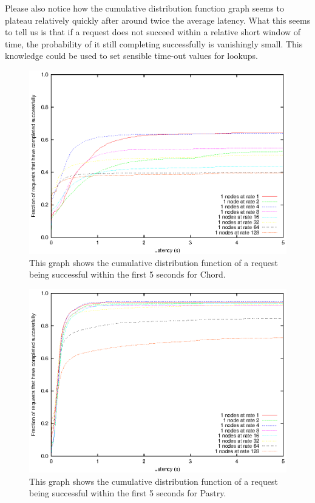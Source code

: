 Please also notice how the cumulative distribution function graph seems to plateau relatively quickly after around twice the average latency. What this seems to tell us is that if a request does not succeed within a relative short window of time, the probability of it still completing successfully is vanishingly small. This knowledge could be used to set sensible time-out values for lookups.

\begin{figure}[!htbp]
  \begin{center}
    \includegraphics[width=0.9\linewidth]{illustrations/cdf_chord.eps}
    \caption{This graph shows the cumulative distribution function of a request being successful within the first 5 seconds for Chord.}
    \label{figChordCDF}
  \end{center}
\end{figure}

\begin{figure}[!htbp]
  \begin{center}
    \includegraphics[width=0.9\linewidth]{illustrations/cdf_pastry.eps}
    \caption{This graph shows the cumulative distribution function of a request being successful within the first 5 seconds for Pastry.}
    \label{figPastryCDF}
  \end{center}
\end{figure}

